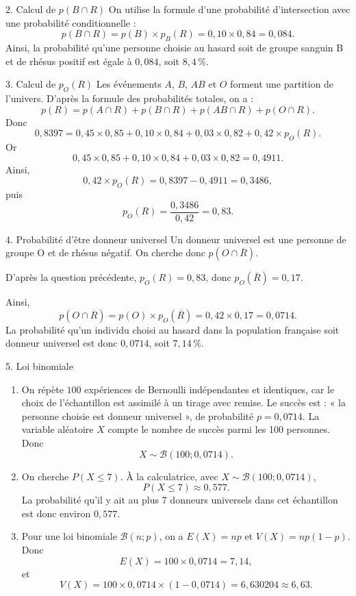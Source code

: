 \documentclass[11pt,a4paper]{article}
\newcounter{question}
\begin{document}
\begin{correctionbox}{2. Calcul de $p(B\cap R)$}
On utilise la formule d'une probabilité d'intersection avec une probabilité conditionnelle :
\[
p(B\cap R)=p(B)\times p_B(R)=0{,}10\times 0{,}84=0{,}084.
\]
Ainsi, la probabilité qu'une personne choisie au hasard soit de groupe sanguin B et de rhésus positif est égale à $0{,}084$, soit $8{,}4\,\%$.
\end{correctionbox}

\begin{correctionbox}{3. Calcul de $p_O(R)$}
Les événements $A$, $B$, $AB$ et $O$ forment une partition de l'univers. D'après la formule des probabilités totales, on a :
\[
p(R)=p(A\cap R)+p(B\cap R)+p(AB\cap R)+p(O\cap R).
\]
Donc
\[
0{,}8397=0{,}45\times0{,}85+0{,}10\times0{,}84+0{,}03\times0{,}82+0{,}42\times p_O(R).
\]
Or
\[
0{,}45\times0{,}85+0{,}10\times0{,}84+0{,}03\times0{,}82=0{,}4911.
\]
Ainsi,
\[
0{,}42\times p_O(R)=0{,}8397-0{,}4911=0{,}3486,
\]
puis
\[
p_O(R)=\dfrac{0{,}3486}{0{,}42}=0{,}83.
\]
\end{correctionbox}

\begin{correctionbox}{4. Probabilité d'être donneur universel}
Un donneur universel est une personne de groupe O et de rhésus négatif. On cherche donc $p(O\cap \overline R)$.

D'après la question précédente, $p_O(R)=0{,}83$, donc $p_O(\overline R)=0{,}17$.

Ainsi,
\[
p(O\cap \overline R)=p(O)\times p_O(\overline R)=0{,}42\times0{,}17=0{,}0714.
\]
La probabilité qu'un individu choisi au hasard dans la population française soit donneur universel est donc $0{,}0714$, soit $7{,}14\,\%$.
\end{correctionbox}

\begin{correctionbox}{5. Loi binomiale}
\begin{enumerate}
  \item On répète $100$ expériences de Bernoulli indépendantes et identiques, car le choix de l'échantillon est assimilé à un tirage avec remise. Le succès est : « la personne choisie est donneur universel », de probabilité $p=0{,}0714$. La variable aléatoire $X$ compte le nombre de succès parmi les 100 personnes. Donc
  \[
  X\sim \mathcal B(100;0{,}0714).
  \]

  \item On cherche $P(X\leqslant 7)$. À la calculatrice, avec $X\sim\mathcal B(100;0{,}0714)$,
  \[
  P(X\leqslant 7)\approx 0{,}577.
  \]
  La probabilité qu'il y ait au plus 7 donneurs universels dans cet échantillon est donc environ $0{,}577$.

  \item Pour une loi binomiale $\mathcal B(n;p)$, on a $E(X)=np$ et $V(X)=np(1-p)$. Donc
  \[
  E(X)=100\times0{,}0714=7{,}14,
  \]
  et
  \[
  V(X)=100\times0{,}0714\times(1-0{,}0714)=6{,}630204\approx 6{,}63.
  \]
\end{enumerate}
\end{correctionbox}
\end{document}
